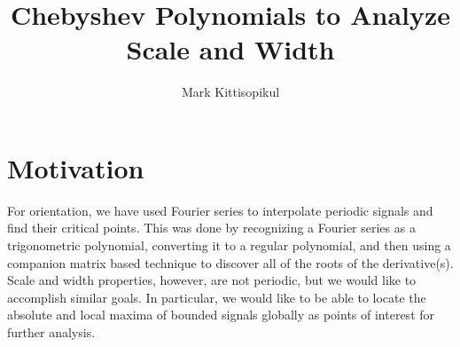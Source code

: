 \documentclass{article}
\title{Chebyshev Polynomials to Analyze Scale and Width}
\author{Mark Kittisopikul}
\begin{document}
\maketitle

\section{Motivation}
For orientation, we have used Fourier series to interpolate periodic signals and find their critical points. This was done by recognizing a Fourier series as a trigonometric polynomial, converting it to a regular polynomial, and then using a companion matrix based technique to discover all of the roots of the derivative(s). Scale and width properties, however, are not periodic, but we would like to accomplish similar goals. In particular, we would like to be able to locate the absolute and local maxima of bounded signals globally as points of interest for further analysis.
\end{document}
